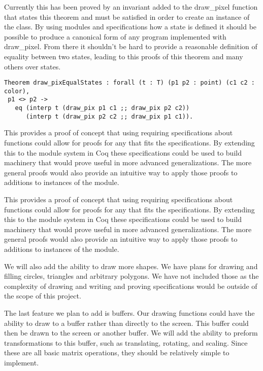 \documentclass{llncs}
\begin{document}
Currently this has been proved by an invariant added to the draw\_pixel function that states this theorem and must be satisfied in order to create an instance of the class.  By using modules and specifications how a state is defined it should be possible to produce a canonical form of any program implemented with draw\_pixel.  From there it shouldn't be hard to provide a reasonable definition of equality between two states, leading to this proofs of this theorem and many others over states.

\begin{lstlisting}
Theorem draw_pixEqualStates : forall (t : T) (p1 p2 : point) (c1 c2 : color),
 p1 <> p2 -> 
   eq (interp t (draw_pix p1 c1 ;; draw_pix p2 c2))
      (interp t (draw_pix p2 c2 ;; draw_pix p1 c1)).
\end{lstlisting}

This provides a proof of concept that using requiring specifications about functions could allow for proofs for any that fits the specifications.
By extending this to the module system in Coq these specifications could be used to build machinery that would prove useful in more advanced generalizations.  The more general proofs would also provide an intuitive way to apply those proofs to additions to instances of the module.

This provides a proof of concept that using requiring specifications about functions could allow for proofs for any that fits the specifications.
By extending this to the module system in Coq these specifications could be used to build machinery that would prove useful in more advanced generalizations.  The more general proofs would also provide an intuitive way to apply those proofs to additions to instances of the module.

We will also add the ability to draw more shapes. We have plans for drawing and filling circles, triangles and arbitrary polygons. We have not included those as the complexity of drawing and writing and proving specifications would be outside of the scope of this project.

The last feature we plan to add is buffers. Our drawing functions could have the ability to draw to a buffer rather than directly to the screen. This buffer could then be drawn to the screen or another buffer. We will add the ability to preform transformations to this buffer, such as translating, rotating, and scaling. Since these are all basic matrix operations, they should be relatively simple to implement.
\end{document}
